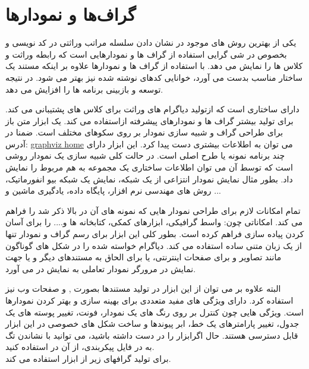 % 
% 
% 
% 
\chapter{گراف‌ها و نمودارها}



یکی از بهترین روش های موجود در نشان دادن سلسله مراتب وراثتی در کد نویسی و بخصوص
در شی گرایی استفاده از گراف ها و نمودارهایی است که رابطه وراثت و کلاس ها را
نمایش می دهد.
با استفاده از گراف ها و نمودارها علاوه بر اینکه مستند یک ساختار مناسب بدست می آورد، خوانایی
کدهای نوشته شده نیز بهتر می شود. در نتیجه توسعه و بازبینی برنامه ها را افزایش می دهد.

 دارای ساختاری است که ازتولید دیاگرام های وراثت برای کلاس های پشتیبانی می کند.
   برای تولید بیشتر گراف ها و نمودارهای پیشرفته
ازاستفاده می کند. یک ابزار متن باز برای طراحی گراف و
شبیه سازی نمودار بر روی سکوهای مختلف است. ضمنا در آدرس:
 \href{http://www.graphviz.org/}{graphviz home} می توان به اطلاعات بیشتری دست پیدا کرد.
این ابزار دارای چند برنامه نمونه یا طرح اصلی است. در حالت
کلی شبیه سازی یک نمودار روشی است که توسط آن می توان اطلاعات ساختاری یک مجموعه
به هم مربوط را نمایش داد. بطور مثال نمایش نمودار انتزاعی از یک شبکه، نمایش یک
شبکه بیو انفورماتیک، روش های مهندسی نرم افزار، پایگاه داده، یادگیری ماشین و
...

 تمام امکانات لازم برای طراحی نمودار هایی که نمونه های آن در بالا
ذکر شد را فراهم می کند. امکاناتی چون: واسط گرافیکی، ابزارهای کمکی، کتابخانه ها
و.... را برای آسان کردن پیاده سازی فراهم کرده است. 
بطور کلی این ابزار برای رسم گراف و نمودار تنها از یک زبان متنی ساده استفاده می کند.
 دیاگرام خواسته شده را در شکل های گوناگون مانند تصاویر و   برای صفحات اینترنتی،  یا  برای الحاق به مستندهای دیگر و یا جهت نمایش در مرورگر نمودار تعاملی به نمایش در می آورد.
 
البته علاوه بر
 می توان از این ابزار در تولید مستندها بصورت
 ,  و صفحات وب نیز استفاده کرد.
 دارای ویژگی های مفید متعددی برای بهینه سازی و بهتر کردن نمودارها است. 
ویژگی هایی چون کنترل بر روی رنگ های یک نمودار، فونت، تغییر پوسته های یک جدول، تغییر پارامترهای یک خط، ابر پیوندها و ساخت شکل های خصوصی در این ابزار قابل دسترسی هستند.
\cite{graph}
حال اگرابزار را در دست داشته باشید، می توانید با نشاندن تگ 
  به  در فایل پیکربندی، از آن در  استفاده کنید.\\
 برای تولید گرافهای زیر از ابزار  استفاده می کند.\\



%
